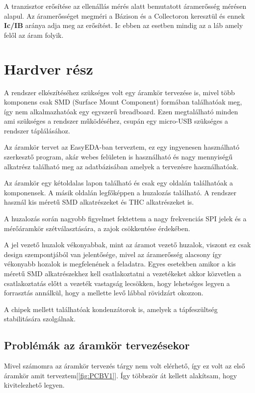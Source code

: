 A tranzisztor erősítése az ellenállás mérés alatt bemutatott áramerősség
mérésen alapul. Az áramerősséget megméri a Bázison és a Collectoron keresztül
és ennek \textbf{Ic/IB} aránya adja meg az erősítést. Ic ebben az esetben mindig
az a láb amely felől az áram folyik.



\section{Hardver rész}

A rendszer elkészítéséhez szükséges volt egy áramkör tervezése is, mivel több komponens
csak SMD (Surface Mount Component) formában találhatóak meg, így nem alkalmazhatóak egy
egyszerű breadboard. Ezen megtalálható minden ami szükséges a rendszer működéséhez, 
csupán egy micro-USB szükséges a rendszer táplálásához.

Az áramkör tervet az EasyEDA-ban terveztem, ez egy ingyenesen használható szerkesztő
program, akár webes felületen is használható és nagy mennyiségű alkatrész található
meg az adatbázisában amelyek a tervezésre használhatóak.

Az áramkör egy kétoldalas lapon található és csak egy oldalán találhatóak a komponensek.
A másik oldalán legfőképpen a huzalozás található. A rendszer használ kis méretű
SMD alkatrészeket és THC alkatrészeket is. 

A huzalozás során nagyobb figyelmet fektettem a nagy frekvenciás SPI jelek
és a mérőáramkör szétválasztására, a zajok csökkentése érdekében.

A jel vezető huzalok vékonyabbak, mint az áramot vezető huzalok, viszont ez csak
design szempontjából van jelentősége, mivel az áramerősség alacsony így vékonyabb
hozalok is megfelenének a feladatra. Egyes esetekben amikor a kis méretű SMD 
alkatrészekhez kell csatlakoztatni a vezetékeket akkor közvetlen a csatlakoztatás
előtt a vezeték vastagság lecsökken, hogy lehetséges legyen a forrasztás annálkül,
hogy a mellette levő lábbal rövidzárt okozzon.

A chipek mellett találhatóak kondenzátorok is, amelyek a tápfeszültség stabilitására
szolgálnak.

\subsection{Problémák az áramkör tervezésekor}

Mivel számomra az áramkör tervezés tárgy nem volt elérhető, így ez volt az első 
áramkör amit terveztem[\ref{fig:PCBV1}]. Így többször át kellett alakítsam, hogy kivitelezhető legyen.


